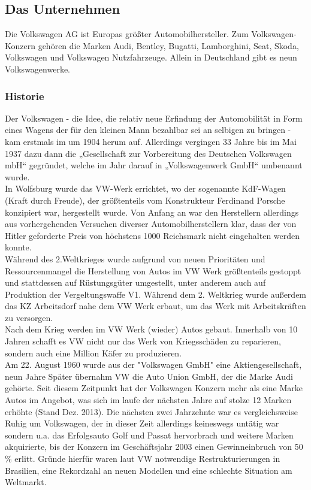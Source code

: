 \documentclass[12pt]{article}
\begin{document}
\subsection{Das Unternehmen}
Die Volkswagen AG ist Europas größter Automobilhersteller. Zum Volkswagen-Konzern gehören die Marken Audi, Bentley, Bugatti, Lamborghini, Seat, Skoda, Volkswagen und Volkswagen Nutzfahrzeuge. Allein in Deutschland gibt es neun Volkswagenwerke.
\subsubsection{Historie}
Der Volkswagen - die Idee, die relativ neue Erfindung der Automobilität in Form eines Wagens der für den kleinen Mann bezahlbar sei an selbigen zu bringen - kam erstmals im um 1904 herum auf. Allerdings vergingen 33 Jahre bis im Mai 1937 dazu dann die „Gesellschaft zur Vorbereitung des Deutschen Volkswagen mbH“ gegründet, welche im Jahr darauf in „Volkswagenwerk GmbH“ umbenannt wurde.\cite{vwchronik} \\
In Wolfsburg wurde das VW-Werk errichtet, wo der sogenannte KdF-Wagen (Kraft durch Freude), der größtenteils vom Konstrukteur Ferdinand Porsche konzipiert war, hergestellt wurde. Von Anfang an war den Herstellern allerdings aus vorhergehenden Versuchen diverser Automobilherstellern klar, dass der von Hitler geforderte Preis von höchstens 1000 Reichsmark nicht eingehalten werden konnte. \cite{geschdautos}\\
Während des 2.Weltkrieges wurde aufgrund von neuen Prioritäten und Ressourcenmangel die Herstellung von Autos im VW Werk größtenteils gestoppt und stattdessen auf Rüstungsgüter umgestellt, unter anderem auch auf Produktion der Vergeltungswaffe V1.\cite{autowp} Während dem 2. Weltkrieg wurde außerdem das KZ Arbeitsdorf nahe dem VW Werk erbaut, um das Werk mit Arbeitskräften zu versorgen.\cite{terror}  
\\
Nach dem Krieg werden im VW Werk (wieder) Autos gebaut. Innerhalb von 10 Jahren schafft es VW nicht nur das Werk von Kriegsschäden zu reparieren, sondern auch eine Million Käfer zu produzieren. \cite{ahwest}\\
Am 22. August 1960 wurde aus der "Volkswagen GmbH" eine Aktiengesellschaft, neun Jahre Später übernahm VW die Auto Union GmbH, der die Marke Audi gehörte. Seit diesem Zeitpunkt hat der Volkswagen Konzern mehr als eine Marke Autos im Angebot, was sich im laufe der nächsten Jahre auf stolze 12 Marken erhöhte (Stand Dez. 2013). \cite{vwag}
Die nächsten zwei Jahrzehnte war es vergleichsweise Ruhig um  Volkswagen, der in dieser Zeit allerdings keineswegs untätig war sondern u.a. das Erfolgsauto Golf und Passat hervorbrach und weitere Marken akquirierte, bis der Konzern im Geschäftsjahr 2003 einen Gewinneinbruch von 50 \% erlitt. Gründe hierfür waren laut VW notwendige Restrukturierungen in Brasilien, eine Rekordzahl an neuen Modellen und eine schlechte Situation am Weltmarkt. \cite{sud} \\
\end{document}
